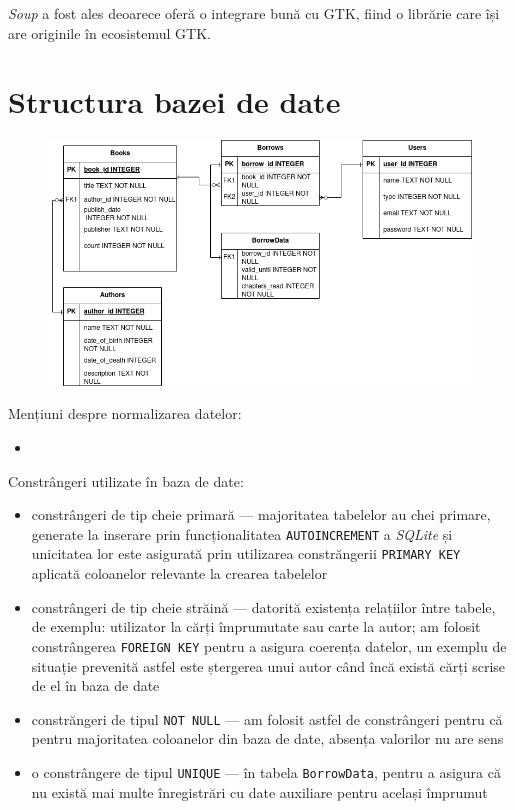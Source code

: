 \documentclass{article}
\begin{document}
    \emph{Soup} a fost ales deoarece oferă o integrare bună cu GTK, fiind o librărie care își are originile
    în ecosistemul GTK.

    \section{Structura bazei de date}

    \begin{figure}[H]
        \includegraphics[width=\linewidth]{ER-Diagram}
        \centering
    \end{figure}

    Mențiuni despre normalizarea datelor:
    \begin{itemize}
        \item
    \end{itemize}
    Constrângeri utilizate în baza de date:
    \begin{itemize}
        \item constrângeri de tip cheie primară --- majoritatea tabelelor au chei primare, generate la inserare prin
        funcționalitatea \texttt{AUTOINCREMENT} a \emph{SQLite} și unicitatea lor este asigurată prin utilizarea
        constrăngerii \texttt{PRIMARY KEY} aplicată coloanelor relevante la crearea tabelelor
        \item constrângeri de tip cheie străină --- datorită existența relațiilor între tabele, de exemplu: utilizator
        la cărți împrumutate sau carte la autor; am folosit constrângerea \texttt{FOREIGN KEY} pentru a asigura coerența
        datelor, un exemplu de situație prevenită astfel este ștergerea unui autor când încă există cărți scrise de el
        în baza de date
        \item constrăngeri de tipul \texttt{NOT NULL} --- am folosit astfel de constrângeri pentru că pentru majoritatea
        coloanelor din baza de date, absența valorilor nu are sens
        \item o constrângere de tipul \texttt{UNIQUE} --- în tabela \texttt{BorrowData}, pentru a asigura că nu există mai
        multe înregistrări cu date auxiliare pentru același împrumut
    \end{itemize}
\end{document}
